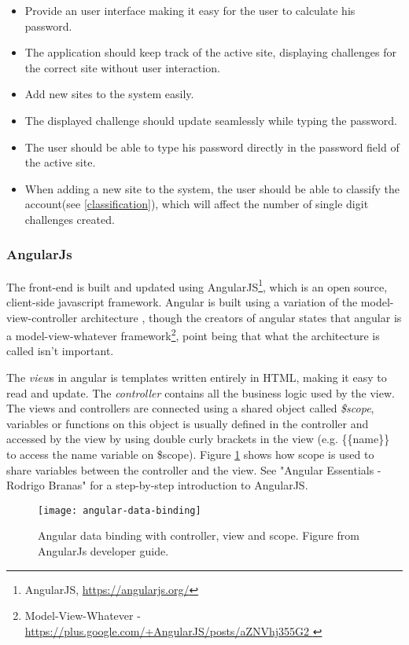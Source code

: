 \begin{itemize}
    \item Provide an user interface making it easy for the user to calculate his password.
    \item The application should keep track of the active site, displaying challenges for the correct site without user interaction.
    \item Add new sites to the system easily. 
    \item The displayed challenge should update seamlessly while typing the password.
    \item The user should be able to type his password directly in the password field of the active site.
    \item When adding a new site to the system, the user should be able to classify the account(see \autoref{classification}), which will affect the number of single digit challenges created.
\end{itemize}


\subsubsection{AngularJs}
The front-end is built and updated using AngularJS\footnote{AngularJS, \url{https://angularjs.org/}}, which is an open source, client-side javascript framework. Angular is built using a variation of the model-view-controller architecture \cite{mvc}, though the creators of angular states that angular is a model-view-whatever framework\footnote{Model-View-Whatever - \url{ https://plus.google.com/+AngularJS/posts/aZNVhj355G2 }}, point being that what the architecture is called isn't important. 
\par The \emph{view}s in angular is templates written entirely in HTML, making it easy to read and update. The \emph{controller} contains all the business logic used by the view. The views and controllers are connected using a shared object called \emph{\$scope}, variables or functions on this object is usually defined in the controller and accessed by the view by using double curly brackets in the view (e.g. \{\{name\}\} to access the name variable on \$scope). Figure \ref{angular-data-binding} shows how scope is used to share variables between the controller and the view. 
See "Angular Essentials - Rodrigo Branas"\cite{angularjs-book} for a step-by-step introduction to AngularJS.

\begin{figure}[h]
    \texttt{[image: angular-data-binding]} 
    \caption{Angular data binding with controller, view and scope. Figure from AngularJs developer guide.}
    \label{angular-data-binding}
\end{figure}



